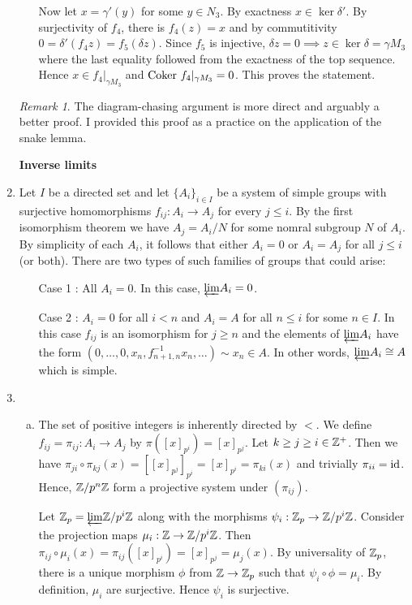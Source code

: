 \documentclass{article}
\theoremstyle{definition}
\theoremstyle{remark}
\newtheorem{remark}[theorem]{Remark}
\begin{document}
\begin{enumerate}[(1)]
\begin{enumerate}[(a)]
                Now let $x = \gamma'(y)$ for some $y \in N_3$. By exactness $x \in \ker \delta'$. By surjectivity of $f_4$, there is  $f_4(z) =  x$ and by commutitivity $0 = \delta'(f_4z) = f_5(\delta z)$. Since $f_5$ is injective, $\delta z = 0 \implies z \in \ker \delta  = \gamma M_3$ where the last equality followed from the exactness of the top sequence. Hence $x \in f_4|_{\gamma M_3}$ and $\mathrm{Coker\ } f_4|_{\gamma M_3} = 0$. This proves the statement.
        \end{enumerate}
        \begin{remark}
          The diagram-chasing argument is more direct and arguably a better proof. I provided this proof as a practice on the application of the snake lemma.
        \end{remark}
\textbf{Inverse limits}
  \item
        Let $I$ be a directed set and let $\{A_i\}_{i \in I}$ be a system of simple groups with surjective homomorphisms $f_{ij}: A_i \to A_j$ for every $j \leq i$. By the first isomorphism theorem we have $A_{j} = A_i/N$ for some nomral subgroup $N$ of $A_i$. By simplicity of each $A_i$, it follows that either $A_i = 0$ or $A_i = A_j$ for all $j \leq i$ (or both). There are two types of such families of groups that could arise:
        \begin{enumerate}
          \item[Case 1]: All $A_i = 0$. In this case, $\underleftarrow{\lim} A_i = 0$.
          \item[Case 2]: $A_i = 0$ for all $i < n$ and $A_i = A$ for all $n \leq i$ for some $n \in I$. In this case $f_{ij}$ is an isomorphism for $j \geq n$ and the elements of $\underleftarrow{\lim} A_i$ have the form $(0, \dots, 0, x_n, f_{n+1, n}^{-1}x_n, \dots) \sim x_n \in A$. In other words, $\underleftarrow{\lim} A_i \cong A$ which is simple.
        \end{enumerate}
  \item
        \begin{enumerate}[(a)]
          \item
                The set of positive integers is inherently directed by $<$. We define $f_{ij} = \pi_{ij}:A_i \to A_j$ by $\pi([x]_{p^i}) = [x]_{p^j}$. Let $k \geq j \geq i \in \mathbb{Z}^+$. Then we have $\pi_{ji} \circ \pi_{kj}(x) = [[x]_{p^j}]_{p^i} = [x]_{p^i} = \pi_{ki}(x)$ and trivially $\pi_{ii} = \text{id}$. Hence, $\mathbb{Z}/p^n\mathbb{Z}$ form a projective system under $(\pi_{ij})$.

                Let $\mathbb{Z}_p = \underleftarrow{\lim} \mathbb{Z}/p^i\mathbb{Z}$ along with the morphisms $\psi_i: \mathbb{Z}_p \to \mathbb{Z} / p^{i}\mathbb{Z}$.  Consider the projection maps $\mu_i:\mathbb{Z} \to \mathbb{Z}/p^{i}\mathbb{Z}$. Then $\pi_{ij} \circ \mu_i(x) = \pi_{ij}([x]_{p^{i}}) = [x]_{p^j} = \mu_j(x)$. By universality of $\mathbb{Z}_p$, there is a unique morphism $\phi$ from $\mathbb{Z} \to \mathbb{Z}_p$ such that $\psi_i \circ \phi = \mu_i$. By definition, $\mu_i$ are surjective. Hence $\psi_i$ is surjective.


\end{enumerate}
\end{enumerate}
\end{document}
